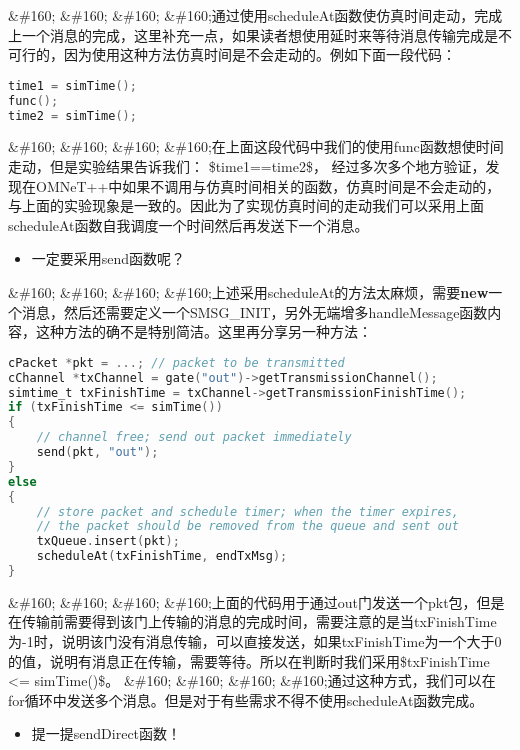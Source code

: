 \&\#160; \&\#160; \&\#160; \&\#160;通过使用scheduleAt函数使仿真时间走动，完成上一个消息的完成，这里补充一点，如果读者想使用延时来等待消息传输完成是不可行的，因为使用这种方法仿真时间是不会走动的。例如下面一段代码：

\begin{lstlisting}[language=c]
time1 = simTime();
func();
time2 = simTime();
\end{lstlisting}

\&\#160; \&\#160; \&\#160; \&\#160;在上面这段代码中我们的使用func函数想使时间走动，但是实验结果告诉我们：
\$time1==time2\$，
经过多次多个地方验证，发现在OMNeT++中如果不调用与仿真时间相关的函数，仿真时间是不会走动的，与上面的实验现象是一致的。因此为了实现仿真时间的走动我们可以采用上面scheduleAt函数自我调度一个时间然后再发送下一个消息。

\begin{itemize}
\item 一定要采用send函数呢？

\end{itemize}

\&\#160; \&\#160; \&\#160; \&\#160;上述采用scheduleAt的方法太麻烦，需要\textbf{new}一个消息，然后还需要定义一个SMSG\_INIT，另外无端增多handleMessage函数内容，这种方法的确不是特别简洁。这里再分享另一种方法：

\begin{lstlisting}[language=c]
cPacket *pkt = ...; // packet to be transmitted
cChannel *txChannel = gate("out")->getTransmissionChannel();
simtime_t txFinishTime = txChannel->getTransmissionFinishTime();
if (txFinishTime <= simTime())
{
    // channel free; send out packet immediately
    send(pkt, "out");
}
else
{
    // store packet and schedule timer; when the timer expires,
    // the packet should be removed from the queue and sent out
    txQueue.insert(pkt);
    scheduleAt(txFinishTime, endTxMsg);
}

\end{lstlisting}

\&\#160; \&\#160; \&\#160; \&\#160;上面的代码用于通过out门发送一个pkt包，但是在传输前需要得到该门上传输的消息的完成时间，需要注意的是当txFinishTime为-1时，说明该门没有消息传输，可以直接发送，如果txFinishTime为一个大于0的值，说明有消息正在传输，需要等待。所以在判断时我们采用\$txFinishTime <= simTime()\$。
\&\#160; \&\#160; \&\#160; \&\#160;通过这种方式，我们可以在for循环中发送多个消息。但是对于有些需求不得不使用scheduleAt函数完成。

\begin{itemize}
\item 提一提sendDirect函数！

\end{itemize}

